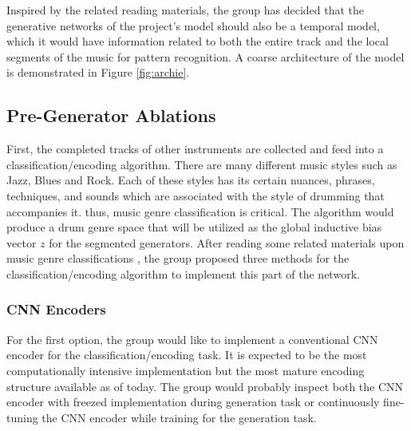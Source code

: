 \begin{par}
    \par \hspace{15pt} Inspired by the related reading materials, the group has decided that the generative networks of the project's model should also be a temporal model, which it would have information related to both the entire track and the local segments of the music for pattern recognition. A coarse architecture of the model is demonstrated in Figure \ref{fig:archie}. 
    
    \subsection{Pre-Generator Ablations} %
    \label{sub:Pre-Generator Ablations}
    \par First, the completed tracks of other instruments are collected and feed into a classification/encoding algorithm. There are many different music styles such as Jazz, Blues and Rock. Each of these styles has its certain nuances, phrases, techniques, and sounds which are associated with the style of drumming that accompanies it. thus, music genre classification is critical. The algorithm would produce a drum genre space that will be utilized as the global inductive bias vector $z$ for the segmented generators. After reading some related materials upon music genre classifications \cite{transfer_classification, active_classification, cnn_classification, svm_classification}, the group proposed three methods for the classification/encoding algorithm to implement this part of the network.

        \subsubsection{CNN Encoders} %
        \label{ssub:Convolution Neural Network Encoders}
            \par For the first option, the group would like to implement a conventional CNN encoder for the classification/encoding task. It is expected to be the most computationally intensive implementation but the most mature encoding structure available as of today. The group would probably inspect both the CNN encoder with freezed implementation during generation task or continuously fine-tuning the CNN encoder while training for the generation task.



\end{par}
